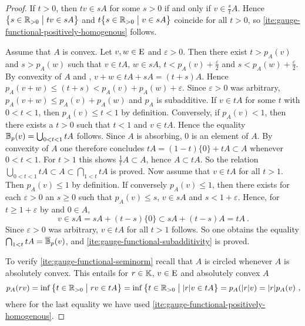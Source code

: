 \begin{proof}
 If $t>0$, then $tv \in sA$ for some $s>0$ if and only if $v \in \frac st A$. 
 Hence $\big\{ s \in \mathbb{R}_{> 0} \bigm\vert t v \in s A \big\}$ and $t \big\{ s \in \mathbb{R}_{> 0} \bigm\vert v \in s A \big\}$
 coincide for all  $t> 0$, so \ref{ite:gauge-functional-positively-homogenous} follows. 
 
 Assume that $A$ is convex. Let $v,w\in \mathrm{E}$ and $\varepsilon >0$. Then there exist
 $t>p_A(v)$ and $s > p_A(w)$ such that 
 $v \in tA$, $w\in sA$, $t < p_A(v) +\frac \varepsilon 2$ and
 $s < p_A(w) +\frac \varepsilon 2$. By convexity of $A$ and
 ,
 $v+w \in tA+ sA = (t+s)A$.
 Hence $p_A(v+w) \leq (t+s) < p_A(v) + p_A (w) + \varepsilon$.
 Since $\varepsilon >0$ was arbitrary, $p_A(v+w) \leq  p_A(v) + p_A (w)$ and $p_A$ is subadditive. 
 If $v \in tA$ for some $t$ with $0 < t<1$, then $p_A(v) \leq t < 1$ by definition.
 Conversely, if $p_A(v) < 1$, then there exists a $t>0$ such that $t<1$ and $v \in tA$.
 Hence the equality $\mathbb{B}_p (v) = \bigcup_{0< t < 1} tA$ follows.
 Since $A$ is absorbing, $0$ is an element of $A$. By convexity of $A$
 one therefore concludes $tA = (1-t) \{ 0 \}  + tA \subset A$ whenever $0< t < 1$.
 For $t>1$ this shows $\frac 1t A \subset A$, hence $A \subset tA$.
 So the relation $\bigcup_{0< t < 1} tA \subset A \subset \bigcap_{1< t} tA$ is proved.
 Now assume that $v \in tA$ for all $t>1$. Then $p_A(v)\leq 1$ by definition.
 If conversely $p_A(v)\leq 1$, then there exists for each $\varepsilon >0$ an $s\geq 0$
 such that $p_A(v) \leq s$, $v \in sA$ and $s < 1 +\varepsilon$.
 Hence, for $t\geq   1 +\varepsilon$ by 
 and $0\in A$,
 \[
    v \in sA = s A + (t-s) \{0\} \subset s A + (t-s) A = tA \ . 
 \]  
 Since $\varepsilon >0$ was arbitrary, $v \in tA$ for all $t>1$ follows. So one obtains
 the equality $\bigcap_{1< t} tA =  \overline{\mathbb{B}}_p (v)$,
 and \ref{ite:gauge-functional-subadditivity} is proved. 
  
 To verify \ref{ite:gauge-functional-seminorm} recall that $A$ is circled whenever
 $A$ is absolutely convex. This entails for $r\in \mathbb{K}$, $v\in \mathrm{E}$
 and absolutely convex $A$
 \[
   p_A (rv)= \inf \big\{ t \in \mathbb{R}_{> 0} \bigm\vert r v \in tA \big\} = 
   \inf \big\{ t \in \mathbb{R}_{> 0} \bigm\vert |r|v \in t A \big\} = p_A (|r|v) = |r| p_A(v) \ ,
 \]
 where for the last equality we have used \ref{ite:gauge-functional-positively-homogenous}.
\end{proof}

